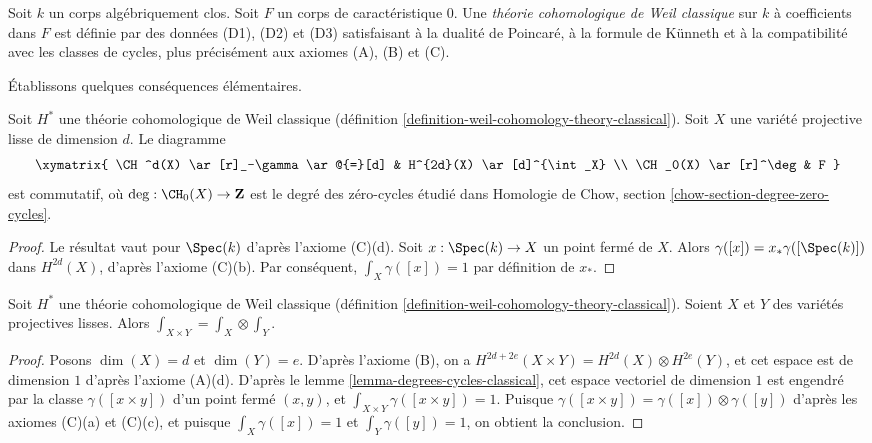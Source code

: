 \begin{definition}
\label{definition-weil-cohomology-theory-classical}
Soit $k$ un corps algébriquement clos.
Soit $F$ un corps de caractéristique $0$.
Une {\it théorie cohomologique de Weil classique} sur $k$ à coefficients dans $F$
est définie par des données (D1), (D2) et (D3) satisfaisant
à la dualité de Poincar\'e, à la formule de K\"unneth et à la compatibilité
avec les classes de cycles, plus précisément aux axiomes (A), (B) et (C).
\end{definition}

\noindent
Établissons quelques conséquences élémentaires.

\begin{lemma}
\label{lemma-degrees-cycles-classical}
Soit $H^*$ une théorie cohomologique de Weil classique
(définition \ref{definition-weil-cohomology-theory-classical}).
Soit $X$ une variété projective lisse de dimension $d$. Le diagramme
$$
\xymatrix{
\CH^d(X) \ar[r]_-\gamma \ar@{=}[d] &
H^{2d}(X) \ar[d]^{\int_X} \\
\CH_0(X) \ar[r]^\deg & F
}
$$
est commutatif, où $\deg : \CH_0(X) \to \mathbf{Z}$ est le degré des
zéro-cycles étudié dans Homologie de Chow, section
\ref{chow-section-degree-zero-cycles}.
\end{lemma}

\begin{proof}
Le résultat vaut pour $\Spec(k)$ d'après l'axiome (C)(d). Soit $x : \Spec(k) \to X$
un point fermé de $X$. Alors $\gamma([x]) = x_*\gamma([\Spec(k)])$
dans $H^{2d}(X)$, d'après l'axiome (C)(b). Par conséquent, $\int_X \gamma([x]) = 1$
par définition de $x_*$.
\end{proof}

\begin{lemma}
\label{lemma-trace-product-classical}
Soit $H^*$ une théorie cohomologique de Weil classique
(définition \ref{definition-weil-cohomology-theory-classical}).
Soient $X$ et $Y$ des variétés projectives lisses.
Alors $\int_{X \times Y} = \int_X \otimes \int_Y$.
\end{lemma}

\begin{proof}
Posons $\dim(X) = d$ et $\dim(Y) = e$. D'après l'axiome (B), on a
$H^{2d + 2e}(X \times Y) = H^{2d}(X) \otimes H^{2e}(Y)$,
et cet espace est de dimension $1$ d'après l'axiome (A)(d).
D'après le lemme \ref{lemma-degrees-cycles-classical},
cet espace vectoriel de dimension $1$ est engendré par
la classe $\gamma([x \times y])$ d'un point fermé $(x, y)$, et
$\int_{X \times Y} \gamma([x \times y]) = 1$.
Puisque $\gamma([x \times y]) = \gamma([x]) \otimes \gamma([y])$
d'après les axiomes (C)(a) et (C)(c), et puisque $\int_X \gamma([x]) = 1$ et
$\int_Y \gamma([y]) = 1$, on obtient la conclusion.
\end{proof}

